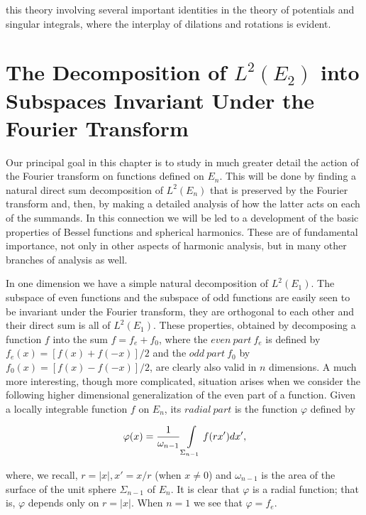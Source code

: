 this theory involving several important identities in the theory of potentials and singular integrals, where the interplay of dilations and rotations is evident.

\section{The Decomposition of  $L^{2}(E_{2})$ into Subspaces Invariant Under the Fourier Transform}

Our principal goal in this chapter is to study in much greater detail the action of the Fourier transform on functions defined on $E_n$. This will be done by finding a natural direct sum decomposition of $L^2(E_n)$ that is preserved by the Fourier transform and, then, by making a detailed analysis of how the latter acts on each of the summands. In this connection we will be led to a development of the basic properties of Bessel functions and spherical harmonics. These are of fundamental importance, not only in other aspects of harmonic analysis, but in many other branches of analysis as well.

In one dimension we have a simple natural decomposition of $L^{2}(E_{1})$. The subspace of even functions and the subspace of odd functions are easily seen to be invariant under the Fourier transform, they are orthogonal to each other and their direct sum is all of $L^{2}(E_{1})$. These properties, obtained by decomposing a function $f$ into the sum $f = f_{e} + f_{0}$, where the $even\ part\ f_{e}$ is defined by $f_{e}(x) = [f(x) + f(-x)]/2$ and the $odd\ part\ f_{0}$ by $f_{0}(x) = [f(x) - f(-x)]/2$, are clearly also valid in $n$ dimensions. A much more interesting, though more complicated, situation arises when we consider the following higher dimensional generalization of the even part of a function. Given a locally integrable function $f$ on $E_{n}$, its $radial\ part$ is the function $\varphi$ defined by

\[
\varphi(x)=\frac{1}{\omega_{n-1}}\intop_{\Sigma_{n-1}}f(r x^{\prime})d x^{\prime},
\]

where, we recall, $r = |x|, x' = x/r$ (when $x \neq 0$) and $\omega_{n-1}$ is the area of the surface of the unit sphere $\Sigma_{n-1}$ of $E_n$. It is clear that $\varphi$ is a radial function; that is, $\varphi$ depends only on $r = |x|$. When $n = 1$ we see that $\varphi = f_e$.

